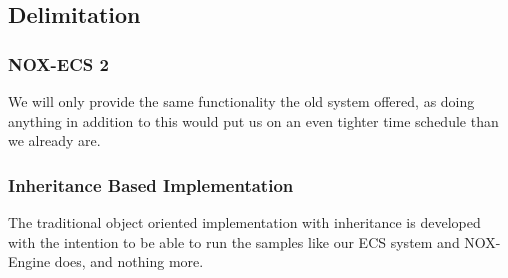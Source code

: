 \subsection{Delimitation}
\subsubsection{NOX-ECS 2}
We will only provide the same functionality the old system offered, as doing anything in addition to this would put us on an even tighter time schedule than we already are.

\subsubsection{Inheritance Based Implementation}
The traditional object oriented implementation with inheritance is developed with the intention to be able to run the samples like our ECS system and NOX-Engine does, and nothing more.